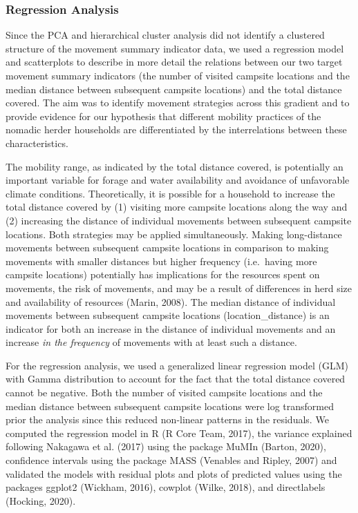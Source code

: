 \documentclass[]{elsarticle} %
\begin{document}
\hypertarget{regression-analysis}{%
\subsubsection{Regression Analysis}\label{regression-analysis}}

Since the PCA and hierarchical cluster analysis did not identify a
clustered structure of the movement summary indicator data, we used a
regression model and scatterplots to describe in more detail the
relations between our two target movement summary indicators (the number
of visited campsite locations and the median distance between subsequent
campsite locations) and the total distance covered. The aim was to
identify movement strategies across this gradient and to provide
evidence for our hypothesis that different mobility practices of the
nomadic herder households are differentiated by the interrelations
between these characteristics.

The mobility range, as indicated by the total distance covered, is
potentially an important variable for forage and water availability and
avoidance of unfavorable climate conditions. Theoretically, it is
possible for a household to increase the total distance covered by (1)
visiting more campsite locations along the way and (2) increasing the
distance of individual movements between subsequent campsite locations.
Both strategies may be applied simultaneously. Making long-distance
movements between subsequent campsite locations in comparison to making
movements with smaller distances but higher frequency (i.e.~having more
campsite locations) potentially has implications for the resources spent
on movements, the risk of movements, and may be a result of differences
in herd size and availability of resources (Marin, 2008). The median
distance of individual movements between subsequent campsite locations
(location\_distance) is an indicator for both an increase in the
distance of individual movements and an increase \emph{in the frequency}
of movements with at least such a distance.

For the regression analysis, we used a generalized linear regression
model (GLM) with Gamma distribution to account for the fact that the
total distance covered cannot be negative. Both the number of visited
campsite locations and the median distance between subsequent campsite
locations were log transformed prior the analysis since this reduced
non-linear patterns in the residuals. We computed the regression model
in R (R Core Team, 2017), the variance explained following Nakagawa et
al. (2017) using the package MuMIn (Barton, 2020), confidence intervals
using the package MASS (Venables and Ripley, 2007) and validated the
models with residual plots and plots of predicted values using the
packages ggplot2 (Wickham, 2016), cowplot (Wilke, 2018), and
directlabels (Hocking, 2020).
\end{document}
